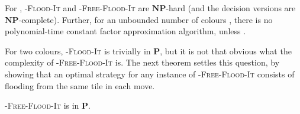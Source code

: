 \documentclass[a4paper,11pt]{llncs}
\newcounter{l}
\newcommand{\Ptime}{\ensuremath{\mathbf{P}}}
\newcommand{\NPtime}{\ensuremath{\mathbf{NP}}}
\newcommand{\Coloroid}[1]{-\textsc{Flood-It}}
\newcommand{\ColoroidFree}[1]{-\textsc{Free-Flood-It}}
\begin{document}
\begin{theorem}
    \label{thm:NPC}
    For , \Coloroid{c} and \ColoroidFree{c} are \NPtime-hard (and the decision versions are \NPtime-complete). Further, for an unbounded number of colours , there is no polynomial-time constant factor approximation algorithm, unless .
\end{theorem}

For two colours, \Coloroid{2} is trivially in \Ptime, but it is not that obvious what the complexity of \ColoroidFree{2} is. The next theorem settles this question, by showing that an optimal strategy for any instance of \ColoroidFree{2} consists of flooding from the same tile in each move.

\begin{theorem}\label{thm:NPC-freetwo}
        \ColoroidFree{2} is in \Ptime.
\end{theorem}
\end{document}
